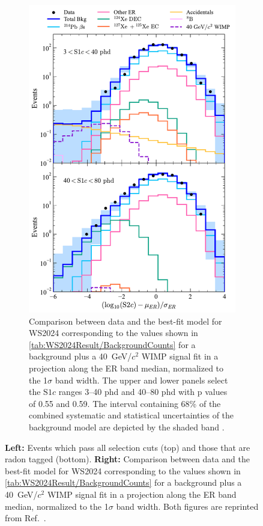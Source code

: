 \begin{figure}[!ht]
	\hfill
	\begin{subfigure}[b]{0.49\textwidth}
		\centering
		\includegraphics[width=\textwidth]{figures/WS2024Result/figure4.pdf}
		\caption{Comparison between data and the best-fit model for WS2024 corresponding to the values shown in \autoref{tab:WS2024Result/BackgroundCounts} for a background plus a 40~GeV/$c^2$ WIMP signal fit in a projection along the ER band median, normalized to the 1$\sigma$ band width. The upper and lower panels select the $\text{S1}c$ ranges 3–40 phd and 40–80 phd with p values of 0.55 and 0.59. The interval containing 68\% of the combined systematic and statistical uncertainties of the background model are depicted by the shaded band \cite{LZCollaboration:2024lux}.}
        \label{fig:WS2024Result/fig4}
	\end{subfigure}
	\caption{\textbf{Left:} Events which pass all selection cuts (top) and those that are radon tagged (bottom). \textbf{Right:} Comparison between data and the best-fit model for WS2024 corresponding to the values shown in \autoref{tab:WS2024Result/BackgroundCounts} for a background plus a 40~GeV/$c^2$ WIMP signal fit in a projection along the ER band median, normalized to the 1$\sigma$ band width. Both figures are reprinted from Ref.~\cite{LZCollaboration:2024lux}.}
	\label{fig:WS2024Result/fig3_fig4}
\end{figure}

